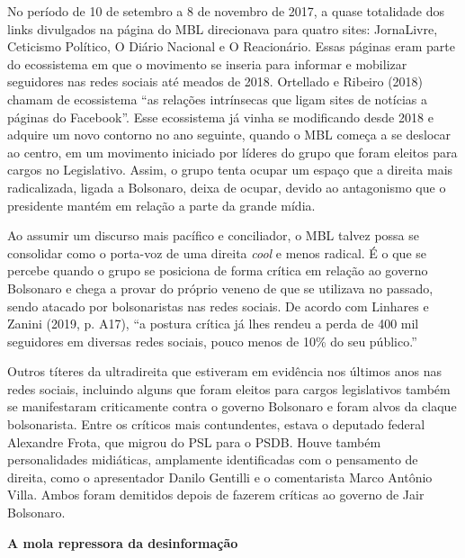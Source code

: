 No período de 10 de setembro a 8 de novembro de 2017, a quase totalidade
dos links divulgados na página do MBL direcionava para quatro sites:
JornaLivre, Ceticismo Político, O Diário Nacional e O Reacionário. Essas
páginas eram parte do ecossistema em que o movimento se inseria para
informar e mobilizar seguidores nas redes sociais até meados de 2018.
Ortellado e Ribeiro (2018) chamam de ecossistema ``as relações
intrínsecas que ligam sites de notícias a páginas do Facebook''. Esse
ecossistema já vinha se modificando desde 2018 e adquire um novo
contorno no ano seguinte, quando o MBL começa a se deslocar ao centro,
em um movimento iniciado por líderes do grupo que foram eleitos para
cargos no Legislativo. Assim, o grupo tenta ocupar um espaço que a
direita mais radicalizada, ligada a Bolsonaro, deixa de ocupar, devido
ao antagonismo que o presidente mantém em relação a parte da grande
mídia.

Ao assumir um discurso mais pacífico e conciliador, o MBL talvez possa
se consolidar como o porta-voz de uma direita \emph{cool} e menos
radical. É o que se percebe quando o grupo se posiciona de forma crítica
em relação ao governo Bolsonaro e chega a provar do próprio veneno de
que se utilizava no passado, sendo atacado por bolsonaristas nas redes
sociais. De acordo com Linhares e Zanini (2019, p. A17), ``a postura
crítica já lhes rendeu a perda de 400 mil seguidores em diversas redes
sociais, pouco menos de 10\% do seu público.''

Outros títeres da ultradireita que estiveram em evidência nos últimos
anos nas redes sociais, incluindo alguns que foram eleitos para cargos
legislativos também se manifestaram criticamente contra o governo
Bolsonaro e foram alvos da claque bolsonarista. Entre os críticos mais
contundentes, estava o deputado federal Alexandre Frota, que migrou do
PSL para o PSDB. Houve também personalidades midiáticas, amplamente
identificadas com o pensamento de direita, como o apresentador Danilo
Gentilli e o comentarista Marco Antônio Villa. Ambos foram demitidos
depois de fazerem críticas ao governo de Jair Bolsonaro.

\textbf{A mola repressora da desinformação}

